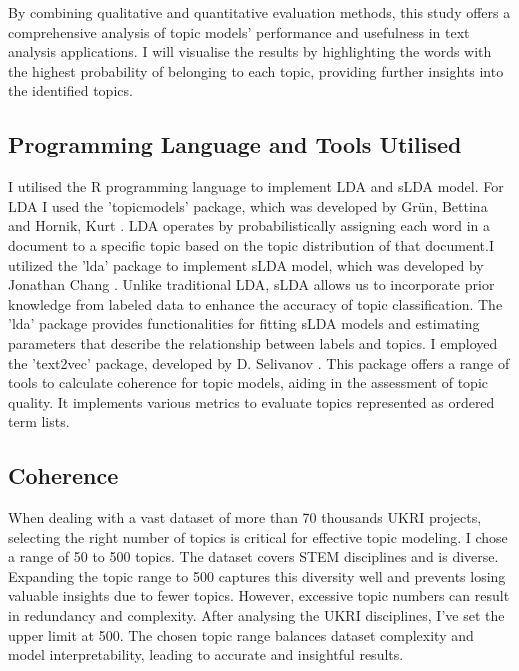 \documentclass[12pt,twoside]{article}
\begin{document}
By combining qualitative and quantitative evaluation methods, this study offers a comprehensive analysis of topic models' performance and usefulness in text analysis applications. I will visualise the results by highlighting the words with the highest probability of belonging to each topic, providing further insights into the identified topics.

\subsection{Programming Language and Tools Utilised}

I utilised the R programming language to implement LDA and sLDA model. For LDA I used the 'topicmodels' package, which was developed by Grün, Bettina and Hornik, Kurt \cite{topicmodels2011}. LDA operates by probabilistically assigning each word in a document to a specific topic based on the topic distribution of that document.I utilized the 'lda' package to implement sLDA model, which was developed by Jonathan Chang \cite{Chang2015}. Unlike traditional LDA, sLDA allows us to incorporate prior knowledge from labeled data to enhance the accuracy of topic classification. The 'lda' package provides functionalities for fitting sLDA models and estimating parameters that describe the relationship between labels and topics. I employed the 'text2vec' package, developed by D. Selivanov  \cite{Selivanov2016}. This package offers a range of tools to calculate coherence for topic models, aiding in the assessment of topic quality. It implements various metrics to evaluate topics represented as ordered term lists. 




\subsection{Coherence}

When dealing with a vast dataset of more than 70 thousands UKRI projects, selecting the right number of topics is critical for effective topic modeling. I chose a range of 50 to 500 topics. The dataset covers STEM disciplines and is diverse. Expanding the topic range to 500 captures this diversity well and prevents losing valuable insights due to fewer topics. However, excessive topic numbers can result in redundancy and complexity. After analysing the UKRI disciplines, I've set the upper limit at 500. The chosen topic range balances dataset complexity and model interpretability, leading to accurate and insightful results.\\\\
\end{document}

